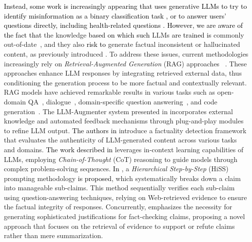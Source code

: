 \textcolor{black}{Instead, some work is increasingly appearing that uses generative LLMs to try to identify misinformation as a binary classification task \citep{wan2024dell,choi2024automated, cao2024can}, or to answer users' questions directly, including health-related questions \citep{wang2024jmlr, khlaut2024efficient}.}
\textcolor{black}{However, we are aware of the fact that} the knowledge \textcolor{black}{based on which such} LLMs \textcolor{black}{are trained is} commonly out-of-date~\citep{he2022rethinking}, and they also \textcolor{black}{risk to} generate factual inconsistent or hallucinated content, as previously introduced \citep{cao-etal-2020-factual,raunak-etal-2021-curious,10.1145/3571730}. To address these issues, current methodologies increasingly rely on \textit{Retrieval-Augmented Generation} (RAG) approaches ~\citep{borgeaud2022improving,guu2020retrieval,izacard2023atlas,lewis2020retrieval,shi2023replug,ren2023investigating}. These approaches enhance LLM responses by integrating retrieved external data, thus conditioning the generation process to be more factual and contextually relevant. RAG models have achieved remarkable results in various tasks such as open-domain QA~\citep{izacard-grave-2021-leveraging,trivedi-etal-2023-interleaving,li-etal-2023-large}, dialogue~\citep{cai-etal-2019-skeleton,cai-etal-2019-retrieval,peng2023check}, domain-specific question answering~\citep{cui2023chatlaw}, and code generation~\citep{zhou2023docprompting}. 
%
The LLM-Augmenter system presented in \citep{peng2023check} incorporates external knowledge and automated feedback mechanisms through plug-and-play modules to refine LLM output. \textcolor{black}{The authors in} \citep{chern2023factool} introduce a factuality detection framework that evaluates the authenticity of LLM-generated content across various tasks and domains. \textcolor{black}{The work described in} \citep{pan2023fact} leverages in-context learning capabilities of LLMs, employing \textit{Chain-of-Thought} (CoT) reasoning to guide models through complex problem-solving sequences. \textcolor{black}{In} \citep{zhang2023towards}, a \textit{Hierarchical Step-by-Step} (HiSS) prompting methodology \textcolor{black}{is proposed}, which systematically breaks down a claim into manageable sub-claims. This method sequentially verifies each sub-claim using question-answering techniques, relying on Web-retrieved evidence to ensure the factual integrity of responses. Concurrently, \citep{zeng2024justilm} emphasizes the necessity for generating sophisticated justifications for fact-checking claims, proposing a novel approach that focuses on the retrieval of evidence to support or refute claims rather than mere summarization.

